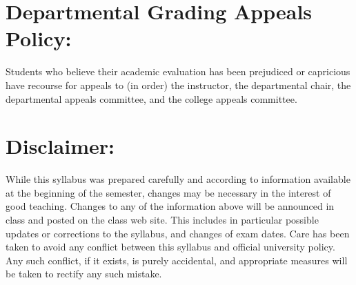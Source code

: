 \documentclass[margin]{res}
\theoremstyle{plain}
\theoremstyle{definition}
\theoremstyle{remark}
\begin{document}
\begin{resume}
\section{Departmental Grading Appeals Policy:} Students who believe their academic evaluation has been prejudiced or capricious have recourse for appeals to (in order) the instructor, the departmental chair, the departmental appeals committee, and the college appeals committee.  

% 

\section{Disclaimer:} 
While this syllabus was prepared carefully and according to information
available at the beginning of the semester, changes may be necessary in the
interest of good teaching. Changes to any of the information above will
be announced in class and posted on the class web site. This includes in
particular possible updates or corrections to the syllabus, and changes of
exam dates. Care has been taken to avoid any conflict between this syllabus and official university policy. Any such conflict, if it exists, is purely accidental, and appropriate measures will be taken to rectify any such mistake. 


\end{resume}
\end{document}
